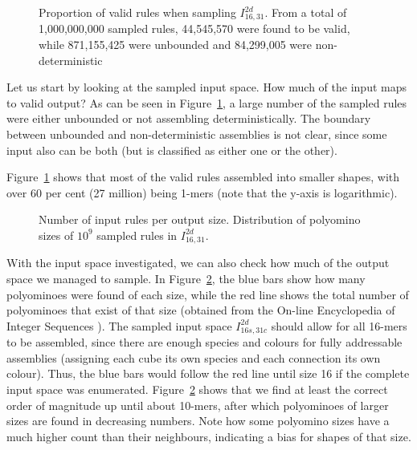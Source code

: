 \begin{figure}[h]
    \centering
    \caption{Proportion of valid rules when sampling \(I_{16,31}^{2d}\). From a total of 1,000,000,000 sampled rules, 44,545,570 were found to be valid, while 871,155,425 were  unbounded and 84,299,005 were non-deterministic}
    \label{fig:ref_validity}
\end{figure}

Let us start by looking at the sampled input space. How much of the input maps to valid output? As can be seen in Figure~\ref{fig:ref_validity}, a large number of the sampled rules were either unbounded or not assembling deterministically. The boundary between unbounded and non-deterministic assemblies is not clear, since some input also can be both (but is classified as either one or the other).

Figure~\ref{fig:ref_validity} shows that most of the valid rules assembled into smaller shapes, with over 60 per cent (27 million) being 1-mers (note that the y-axis is logarithmic).

\begin{figure}[h]
    \centering
    \caption{Number of input rules per output size. Distribution of polyomino sizes of \(10^9\) sampled rules in \(I_{16,31}^{2d}\).
    }
    \label{fig:ref_distr}
\end{figure}

With the input space investigated, we can also check how much of the output space we managed to sample. In Figure~\ref{fig:ref_distr}, the blue bars show how many polyominoes were found of each size, while the red line shows the total number of polyominoes that exist of that size (obtained from the On-line Encyclopedia of Integer Sequences \cite{sloane1995encyclopedia, oeisA000988}). The sampled input space \(I_{16s,31c}^{2d}\) should allow for all 16-mers to be assembled, since there are enough species and colours for fully addressable assemblies (assigning each cube its own species and each connection its own colour). Thus, the blue bars would follow the red line until size 16 if the complete input space was enumerated. Figure~\ref{fig:ref_distr} shows that we find at least the correct order of magnitude up until about 10-mers, after which polyominoes of larger sizes are found in decreasing numbers. Note how some polyomino sizes have a much higher count than their neighbours, indicating a bias for shapes of that size.

